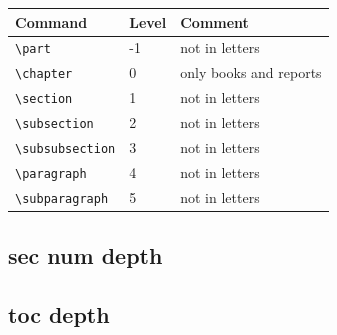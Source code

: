 \documentclass[12pt, a4paper, oneside]{book}
\let\stdsection\section
\renewcommand\section{\newpage\stdsection}
\begin{document}
			\begin{table}[hbp]
			\centering 
			\begin{tabular}{ p{} p{} p{} }
			\toprule
			Command				&Level	&Comment\\
			\midrule
			\verb|\part|				&-1	&not in letters\\
			\verb|\chapter|			&0		&only books and reports\\
			\verb|\section|			&1		&not in letters\\
			\verb|\subsection|		&2		&not in letters\\
			\verb|\subsubsection|	&3		&not in letters\\
			\verb|\paragraph|		&4		&not in letters\\
			\verb|\subparagraph|		&5		&not in letters\\
			\bottomrule
			\end{tabular} 
			\end{table}
	
	
			\subsection{sec num depth}
	
	
	
			\subsection{toc depth}
	
	
	
	
		\newpage  \null
\end{document}
